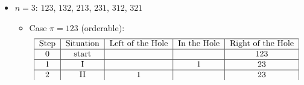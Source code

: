 \documentclass[10pt]{article}
\begin{document}
\begin{enumerate}
\begin{enumerate}
\begin{itemize}
\begin{itemize}
\begin{align*}
\begin{tabular}{|c|c|c|c|c|}
                             \hline
                        \end{tabular}
                    \end{align*}
                \item Case $\pi = 21$ (orderable):
                    \begin{align*}
                        \begin{tabular}{|c|c|c|c|c|}
                            \hline
                             \text{Step}& \text{Situation} & \text{Left of the Hole} & \text{In the Hole} & \text{Right of the Hole}\\
                             \hline
                             0& \text{start} &  &  & 21\\
                             \hline
                             1& \text{I} &  & 2 & 1\\
                             \hline
                             2& \text{I} & & 12 & \\
                             \hline
                             3& \text{III} & 1 & 2 & \\
                             \hline
                             4& \text{III} & 12 &  & \\
                             \hline
                        \end{tabular}
                    \end{align*}
            \end{itemize}
            Therefore, $a_2 = 2$.
        \item $n=3$: $123$, $132$, $213$, $231$, $312$, $321$
            \begin{itemize}
                \item Case $\pi = 123$ (orderable):
                    \begin{align*}
                        \begin{tabular}{|c|c|c|c|c|}
                            \hline
                             \text{Step}& \text{Situation} & \text{Left of the Hole} & \text{In the Hole} & \text{Right of the Hole}\\
                             \hline
                             0& \text{start} &  &  & 123\\
                             \hline
                             1& \text{I} &  & 1 & 23\\
                             \hline
                             2& \text{II} & 1 &  & 23\\

\end{tabular}
\end{align*}
\end{itemize}
\end{itemize}
\end{enumerate}
\end{enumerate}
\end{document}
